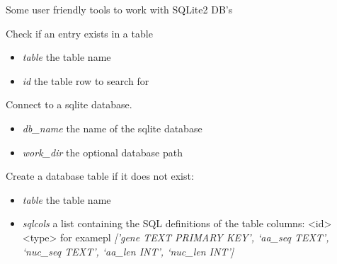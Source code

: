 \documentclass[a4paper,11pt,english]{sphinxmanual}
\begin{document}
\begin{fulllineitems}
\label{modules_doc:cbmpy.CBNetDB.DBTools}
Some user friendly tools to work with SQLite2 DB's

\begin{fulllineitems}
\label{modules_doc:cbmpy.CBNetDB.DBTools.checkEntry}
Check if an entry exists in a table
\begin{itemize}
\item {} 
\emph{table} the table name

\item {} 
\emph{id} the table row to search for

\end{itemize}

\end{fulllineitems}


\begin{fulllineitems}
\label{modules_doc:cbmpy.CBNetDB.DBTools.connectSQLiteDB}
Connect to a sqlite database.
\begin{itemize}
\item {} 
\emph{db\_name} the name of the sqlite database

\item {} 
\emph{work\_dir} the optional database path

\end{itemize}

\end{fulllineitems}


\begin{fulllineitems}
\label{modules_doc:cbmpy.CBNetDB.DBTools.createDBTable}
Create a database table if it does not exist:
\begin{itemize}
\item {} 
\emph{table} the table name

\item {} 
\emph{sqlcols} a list containing the SQL definitions of the table columns: \textless{}id\textgreater{} \textless{}type\textgreater{} for examepl \emph{{[}'gene TEXT PRIMARY KEY', `aa\_seq TEXT', `nuc\_seq TEXT', `aa\_len INT', `nuc\_len INT'{]}}


\end{itemize}
\end{fulllineitems}
\end{fulllineitems}
\end{document}

